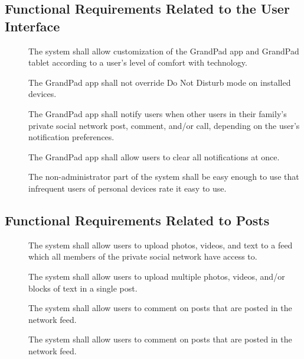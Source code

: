\subsection*{Functional Requirements Related to the User Interface}

\begin{description}
    \item[\textbf{\showfuncuicounter}]
        The system shall allow customization of the GrandPad app and GrandPad
            tablet according to a user's level of comfort with technology.
    \item[\textbf{\showfuncuicounter}]
        The GrandPad app shall not override Do Not Disturb mode on installed
            devices.
    \item[\textbf{\showfuncuicounter}]
        The GrandPad app shall notify users when other users in their family's
            private social network post, comment, and/or call, depending on the
            user's notification preferences.
    \item[\textbf{\showfuncuicounter}]
        The GrandPad app shall allow users to clear all notifications at
            once.
    \item[\textbf{\showfuncuicounter}]
        The non-administrator part of the system shall be easy enough to use
            that infrequent users of personal devices rate it easy to use.
\end{description}

\subsection*{Functional Requirements Related to Posts}

\begin{description}
    \item[\textbf{\showfuncpostcounter}]
        The system shall allow users to upload photos, videos, and text to a
            feed which all members of the private social network have access to.
    \item[\textbf{\showfuncpostcounter}]
        The system shall allow users to upload multiple photos, videos, and/or
            blocks of text in a single post.
    \item[\textbf{\showfuncpostcounter}]
        The system shall allow users to comment on posts that are posted in the
            network feed.
    \item[\textbf{\showfuncpostcounter}]
        The system shall allow users to comment on posts that are posted in the
            network feed.
\end{description}

